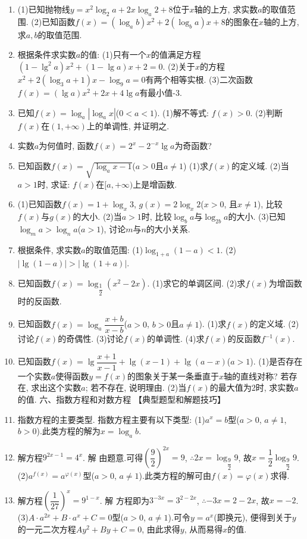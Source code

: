 \documentclass[10pt,a4paper]{article}
\begin{document}
\begin{enumerate}[1.]
\item (1)已知抛物线$y=x^2\log _2a+2x\log _a2+8$位于$x$轴的上方, 求实数$a$的取值范围.
(2)已知函数$f(x)=(\log _ab)x^2+2(\log _ba)x+8$的图象在$x$轴的上方, 求$a,b$的取值范围.
\item 根据条件求实数$a$的值:
(1)只有一个$x$的值满足方程$(1-\lg ^2a)x^2+(1-\lg a)x+2=0$.
(2)关于$x$的方程$x^2+2(\log _3a+1)x-\log _9a=0$有两个相等实根.
(3)二次函数$f(x)=(\lg a)x^2+2x+4\lg a$有最小值-3.
\item 已知$f(x)=\log _a|\log _ax|$($0<a<1$).
(1)解不等式: $f(x)>0$.
(2)判断$f(x)$在$(1,+\infty)$上的单调性, 并证明之.
\item 实数$a$为何值时, 函数$f(x)=2^x-2^{-x}\lg a$为奇函数?
\item 已知函数$f(x)=\sqrt {\log _ax-1}$($a>0$且$a\ne 1$)
(1)求$f(x)$的定义域.
(2)当$a>1$时, 求证: $f(x)$在$[a,+\infty)$上是增函数.
\item (1)已知函数$f(x)=1+\log _x3$, $g(x)=2\log _x2$($x>0$, 且$x\ne 1$), 比较$f(x)$与$g(x)$的大小.
(2)当$a>1$时, 比较$\log _ba$与$\log _{2b}a$的大小.
(3)已知$\log _ma>\log _na$($a>1$), 讨论$m$与$n$的大小关系.
\item 根据条件, 求实数$a$的取值范围:
(1)$\log _{1+a}(1-a)<1$.			(2)$|\lg (1-a)|>|\lg (1+a)|$.
\item 已知函数$f(x)=\log _{\dfrac 12}(x^2-2x)$.
(1)求它的单调区间.				(2)求$f(x)$为增函数时的反函数.
\item 已知函数$f(x)=\log _a\dfrac{x+b}{x-b}$($a>0$, $b>0$且$a\ne 1$).
(1)求$f(x)$的定义域.			(2)讨论$f(x)$的奇偶性.
(3)讨论$f(x)$的单调性.			(4)求$f(x)$的反函数$f^{-1}(x)$.
\item 已知函数$f(x)=\lg \dfrac{x+1}{x-1}+\lg (x-1)+\lg (a-x)$($a>1$).
(1)是否存在一个实数$a$使得函数$y=f(x)$的图象关于某一条垂直于$x$轴的直线对称? 若存在, 求出这个实数$a$; 若不存在, 说明理由.
(2)当$f(x)$的最大值为2时, 求实数$a$的值.
六、指数方程和对数方程
【典型题型和解题技巧】
\item 指数方程的主要类型.
指数方程主要有以下类型:
(1)$a^x=b$型($a>0$, $a\ne 1$, $b>0$).此类方程的解为$x=\log _ab$.
\item 解方程$9^{2x-1}=4^x$.
解  由题意.可得$(\dfrac 92)^{2x}=9$, $\therefore 2x=\log _{\dfrac 92}9$, 故$x=\dfrac 12\log _{\dfrac 92}9$.
(2)$a^{f(x)}=a^{\varphi (x)}$型($a>0$, $a\ne 1$).此类方程的解可由$f(x)=\varphi (x)$求得.
\item 解方程$(\dfrac 1{27})^x=9^{1-x}$.
解  方程即为$3^{-3x}=3^{2-2x}$, $\therefore -3x=2-2x$, 故$x=-2$.
(3)$A\cdot a^{2x}+B\cdot a^x+C=0$型($a>0$, $a\ne 1$).可令$y=a^x$(即换元), 便得到关于$y$的一元二次方程$Ay^2+By+C=0$, 由此求得$y$, 从而易得$x$的值.

\end{enumerate}
\end{document}
